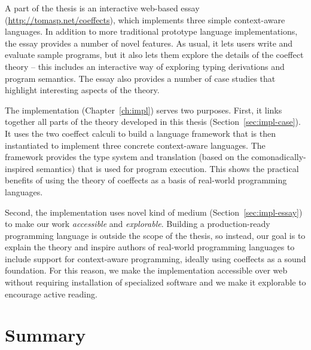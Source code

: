 A part of the thesis is an interactive web-based essay (\url{http://tomasp.net/coeffects}),
which implements three simple context-aware languages. In addition to more traditional prototype
language implementations, the essay provides a number of novel features. As usual, it lets users
write and evaluate sample programs, but it also lets them explore the details of the coeffect
theory -- this includes an interactive way of exploring typing derivations and program semantics.
The essay also provides a number of case studies that highlight interesting aspects of the theory.

The implementation (Chapter~\ref{ch:impl}) serves two purposes. First, it links together all parts
of the theory developed in this thesis (Section~\ref{sec:impl-case}). It uses the two coeffect calculi
to build a language framework that is then instantiated to implement three concrete context-aware
languages. The  framework provides the type system and translation (based on the
comonadically-inspired semantics) that is used for program execution. This shows the practical
benefits of using the theory of coeffects as a basis of real-world programming languages.

Second, the implementation uses novel kind of medium (Section~\ref{sec:impl-essay}) to make our work
\emph{accessible} and \emph{explorable}. Building a production-ready programming language is outside
the scope of the  thesis, so instead, our goal is to explain the theory and inspire authors of
real-world programming languages to include support for context-aware programming, ideally using
coeffects as a sound foundation. For this reason, we make the implementation accessible over web
without requiring installation of specialized software and we make it explorable to encourage
active reading.

%
%

\section{Summary}
\label{sec:conc-conclusions}

